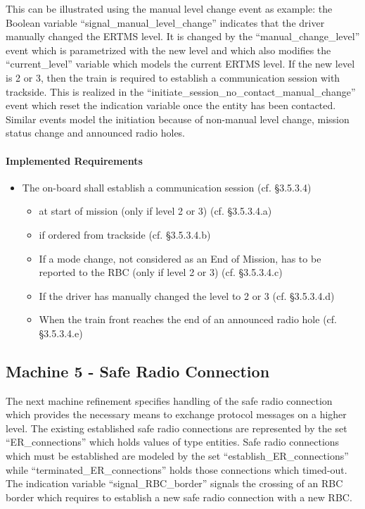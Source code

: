 \documentclass{template/openetcs_article}
\begin{document}
This can be illustrated using the manual level change event as example: the
Boolean variable ``signal\_manual\_level\_change'' indicates that the driver
manually changed the ERTMS level. It is changed by the ``manual\_change\_level''
event which is parametrized with the new level and which also modifies the
``current\_level'' variable which models the current ERTMS level. If the new
level is 2 or 3, then the train is required to establish a communication session
with trackside. This is realized in the
``initiate\_session\_no\_contact\_manual\_change'' event which reset the
indication variable once the entity has been contacted.  Similar events model
the initiation because of non-manual level change, mission status change and
announced radio holes.

\paragraph{Implemented Requirements}
\label{sec:impl-requ-3}

\begin{itemize}
\item The on-board shall establish a communication session (cf. §3.5.3.4)
  \begin{itemize}
  \item at start of mission (only if level 2 or 3) (cf. §3.5.3.4.a)
  \item if ordered from trackside (cf. §3.5.3.4.b)
  \item If a mode change, not considered as an End of Mission, has to be
    reported to the RBC (only if level 2 or 3) (cf. §3.5.3.4.c)
  \item If the driver has manually changed the level to 2 or 3 (cf. §3.5.3.4.d)
  \item When the train front reaches the end of an announced radio hole
    (cf. §3.5.3.4.e)
  \end{itemize}
\end{itemize}



\subsection{Machine 5 - Safe Radio Connection}
\label{sec:machine-5-safe}

The next machine refinement specifies handling of the safe radio connection
which provides the necessary means to exchange protocol messages on a higher
level. The existing established safe radio connections are represented by the
set ``ER\_connections'' which holds values of type entities. Safe radio
connections which must be established are modeled by the set
``establish\_ER\_connections'' while ``terminated\_ER\_connections'' holds those
connections which timed-out. The indication variable ``signal\_RBC\_border''
signals the crossing of an RBC border which requires to establish a new safe
radio connection with a new RBC.
\end{document}
